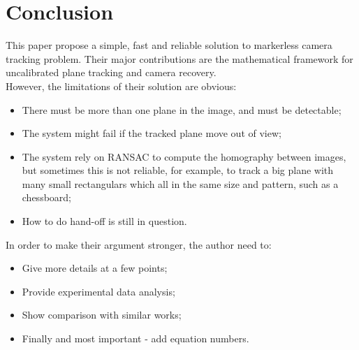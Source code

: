 \documentclass[10pt,twocolumn,letterpaper]{article}
\begin{document}
\section{Conclusion}

This paper propose a simple, fast and reliable solution to markerless camera tracking problem. 
Their major contributions are the mathematical framework for 
uncalibrated plane tracking and camera recovery.\\

However, the limitations of their solution are obvious: 
\begin{itemize}
\item There must be more than one plane in the image, and must be detectable; 
\item The system might fail if the tracked plane move out of view;
\item The system rely on RANSAC to compute the homography between images, 
but sometimes this is not reliable, for example, to track a big plane with many 
small rectangulars which all in the same size and pattern, such as a chessboard;
\item How to do hand-off is still in question.
\end{itemize}

In order to make their argument stronger, the author need to:
\begin{itemize}
\item Give more details at a few points;
\item Provide experimental data analysis;
\item Show comparison with similar works;
\item Finally and most important - add equation numbers.
\end{itemize}

\end{document}
